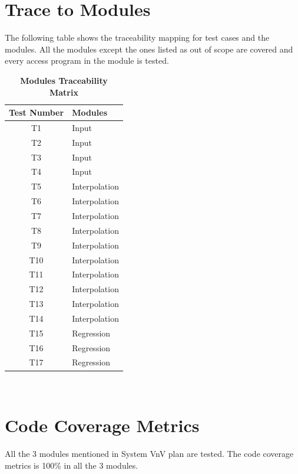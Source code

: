 \documentclass[12pt, titlepage]{article}
\begin{document}
		
\section{Trace to Modules}	

The following table shows the traceability mapping for test cases and the 
modules. All the modules except the ones listed as out of scope are 
covered and 
every access program in the module is tested. 

\begin{table}
	\caption{\textbf{Modules Traceability Matrix}}
	\label{Table:Table_TraceabilityM}  
	\begin{tabular}{|c|p{5cm}|}
		\hline	
		\textbf{Test Number} & \textbf{Modules} \\
		\hline 
		T1&  Input      \\ \hline
		T2&  Input      \\ \hline
		T3&  Input     \\ \hline
		T4&  Input     \\ \hline
		T5&  Interpolation      \\ \hline
		T6&  Interpolation     \\ \hline
		T7&  Interpolation     \\ \hline
		T8&  Interpolation      \\ \hline
		T9&  Interpolation     \\ \hline
		T10& Interpolation      \\ \hline
		T11& Interpolation      \\ \hline
		T12& Interpolation     \\ \hline
		T13& Interpolation     \\ \hline
		T14& Interpolation      \\ \hline
		T15& Regression     \\ \hline
		T16& Regression     \\ \hline
		T17& Regression      \\ \hline
		
	\end{tabular}\\
\end{table}


	

\section{Code Coverage Metrics} 

All the 3 modules mentioned in System VnV plan are tested. The code 
coverage 
metrics is 100\% in all the 3 modules. 




\end{document}
